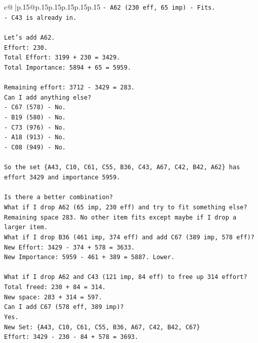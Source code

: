 \documentclass{article}
\begin{document}
{\begin{supertabular}{c@{$\;$}|p{.15\linewidth}@{}p{.15\linewidth}p{.15\linewidth}p{.15\linewidth}p{.15\linewidth}p{.15\linewidth}}
{{{\texttt{{-} A62 (230 eff, 65 imp) {-} Fits.} \\
\texttt{{-} C43 is already in.} \\
\\ 
\texttt{Let's add A62.} \\
\texttt{Effort: 230.} \\
\texttt{Total Effort: 3199 + 230 = 3429.} \\
\texttt{Total Importance: 5894 + 65 = 5959.} \\
\\ 
\texttt{Remaining effort: 3712 {-} 3429 = 283.} \\
\texttt{Can I add anything else?} \\
\texttt{{-} C67 (578) {-} No.} \\
\texttt{{-} B19 (580) {-} No.} \\
\texttt{{-} C73 (976) {-} No.} \\
\texttt{{-} A18 (913) {-} No.} \\
\texttt{{-} C08 (949) {-} No.} \\
\\ 
\texttt{So the set \{A43, C10, C61, C55, B36, C43, A67, C42, B42, A62\} has effort 3429 and importance 5959.} \\
\\ 
\texttt{Is there a better combination?} \\
\texttt{What if I drop A62 (65 imp, 230 eff) and try to fit something else?} \\
\texttt{Remaining space 283. No other item fits except maybe if I drop a larger item.} \\
\texttt{What if I drop B36 (461 imp, 374 eff) and add C67 (389 imp, 578 eff)?} \\
\texttt{New Effort: 3429 {-} 374 + 578 = 3633.} \\
\texttt{New Importance: 5959 {-} 461 + 389 = 5887. Lower.} \\
\\ 
\texttt{What if I drop A62 and C43 (121 imp, 84 eff) to free up 314 effort?} \\
\texttt{Total freed: 230 + 84 = 314.} \\
\texttt{New space: 283 + 314 = 597.} \\
\texttt{Can I add C67 (578 eff, 389 imp)?} \\
\texttt{Yes.} \\
\texttt{New Set: \{A43, C10, C61, C55, B36, A67, C42, B42, C67\}} \\
\texttt{Effort: 3429 {-} 230 {-} 84 + 578 = 3693.} \\
}}}
\end{supertabular}}
\end{document}
